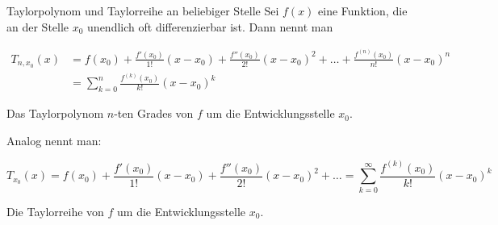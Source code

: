 \begin{definition}
	{Taylorpolynom und Taylorreihe an beliebiger Stelle}{}
	Sei \( f(x) \) eine Funktion, die an der Stelle \( x_0 \) unendlich oft differenzierbar ist. Dann nennt man

	\begin{align*}
		T_{n,x_0}(x) & = f(x_0) + \frac{f'(x_0)}{1!}(x-x_0) + \frac{f''(x_0)}{2!}(x-x_0)^2 + \ldots + \frac{f^{(n)}(x_0)}{n!}(x-x_0)^n \\
		             & = \sum_{k=0}^{n} \frac{f^{(k)}(x_0)}{k!}(x-x_0)^k
	\end{align*}

	Das Taylorpolynom \(n\)-ten Grades von \(f\) um die Entwicklungsstelle \(x_0\).

	Analog nennt man:

	\[
		T_{x_0}(x) = f(x_0) + \frac{f'(x_0)}{1!}(x-x_0) + \frac{f''(x_0)}{2!}(x-x_0)^2 + \ldots = \sum_{k=0}^{\infty} \frac{f^{(k)}(x_0)}{k!}(x-x_0)^k
	\]

	Die Taylorreihe von \(f\) um die Entwicklungsstelle \(x_0\).

\end{definition}

